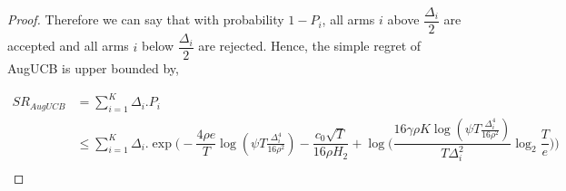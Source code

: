 \begin{proof}
Therefore we can say that with probability $1-P_{i}$, all arms $i$ above $\dfrac{\Delta_{i}}{2}$ are accepted and all arms $i$ below $\dfrac{\Delta_{i}}{2}$ are rejected. Hence, the simple regret of AugUCB is upper bounded by,

\begin{align*}
SR_{AugUCB} &= \sum_{i=1}^{K} \Delta_{i}. P_{i}\\
& \leq \sum_{i=1}^{K} \Delta_{i}. \exp\bigg(-\dfrac{4\rho e}{T}\log (\psi T\frac{\Delta_{i}^{4}}{16\rho^{2}})-\dfrac{c_{0}\sqrt{T}}{16\rho H_{2}} + \log \big( \dfrac{16\gamma\rho K\log (\psi T \frac{\Delta_{i}^{4}}{16\rho^{2}})}{T\Delta_{i}^{2}}\log_{2}\dfrac{T}{e} \big) \bigg) \\
\end{align*}

%
%
%
%
%
%
%
%
%
%

\end{proof}

